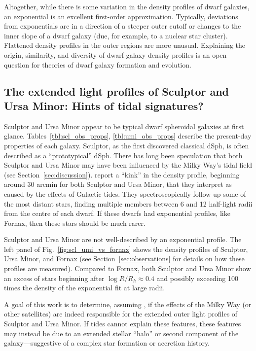 Altogether, while there is some variation in the density profiles of
dwarf galaxies, an exponential is an excellent first-order
approximation. Typically, deviations from exponentials are in a
direction of a steeper outer cutoff or changes to the inner slope of a
dwarf galaxy (due, for example, to a nuclear star cluster). Flattened
density profiles in the outer regions are more unusual. Explaining the
origin, similarity, and diversity of dwarf galaxy density profiles is an
open question for theories of dwarf galaxy formation and evolution.

\subsection{The extended light profiles of Sculptor and Ursa Minor:
Hints of tidal
signatures?}\label{the-extended-light-profiles-of-sculptor-and-ursa-minor-hints-of-tidal-signatures}

Sculptor and Ursa Minor appear to be typical dwarf spheroidal galaxies
at first glance. Tables~\ref{tbl:scl_obs_props}, \ref{tbl:umi_obs_props}
describe the present-day properties of each galaxy. Sculptor, as the
first discovered classical dSph, is often described as a
``prototypical'' dSph. There has long been speculation that both
Sculptor and Ursa Minor may have been influenced by the Milky Way's
tidal field (see Section~\ref{sec:discussion}).
\citet{sestito+2023a, sestito+2023b} report a ``kink'' in the density
profile, beginning around 30 arcmin for both Sculptor and Ursa Minor,
that they interpret as caused by the effects of Galactic tides. They
spectroscopically follow up some of the most distant stars, finding
multiple members between 6 and 12 half-light radii from the centre of
each dwarf. If these dwarfs had exponential profiles, like Fornax, then
these stars should be much rarer.

Sculptor and Ursa Minor are not well-described by an exponential
profile. The left panel of Fig.~\ref{fig:scl_umi_vs_fornax} shows the
density profiles of Sculptor, Ursa Minor, and Fornax (see
Section~\ref{sec:observations} for details on how these profiles are
measured). Compared to Fornax, both Sculptor and Ursa Minor show an
excess of stars beginning after \(\log R/R_h\approx 0.4\) and possibly
exceeding 100 times the density of the exponential fit at large radii.

A goal of this work is to determine, assuming \LCDM{}, if the effects of
the Milky Way (or other satellites) are indeed responsible for the
extended outer light profiles of Sculptor and Ursa Minor. If tides
cannot explain these features, these features may instead be due to an
extended stellar ``halo'' or second component of the galaxy---suggestive
of a complex star formation or accretion history.


